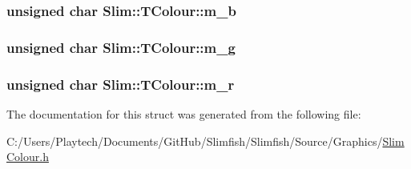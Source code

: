 \subsubsection[{m\+\_\+b}]{\setlength{\rightskip}{0pt plus 5cm}unsigned char Slim\+::\+T\+Colour\+::m\+\_\+b}\label{struct_slim_1_1_t_colour_a0091d4378739a9a90984540ea47a080c}
\hypertarget{struct_slim_1_1_t_colour_a2dbe48be2e7d271929c315c4d27dcf1b}{}
\subsubsection[{m\+\_\+g}]{\setlength{\rightskip}{0pt plus 5cm}unsigned char Slim\+::\+T\+Colour\+::m\+\_\+g}\label{struct_slim_1_1_t_colour_a2dbe48be2e7d271929c315c4d27dcf1b}
\hypertarget{struct_slim_1_1_t_colour_aea6d46279a9f50ebfeea63e8e77868fc}{}
\subsubsection[{m\+\_\+r}]{\setlength{\rightskip}{0pt plus 5cm}unsigned char Slim\+::\+T\+Colour\+::m\+\_\+r}\label{struct_slim_1_1_t_colour_aea6d46279a9f50ebfeea63e8e77868fc}


The documentation for this struct was generated from the following file\+:\begin{DoxyCompactItemize}
\item 
C\+:/\+Users/\+Playtech/\+Documents/\+Git\+Hub/\+Slimfish/\+Slimfish/\+Source/\+Graphics/\hyperlink{_slim_colour_8h}{Slim\+Colour.\+h}\end{DoxyCompactItemize}
